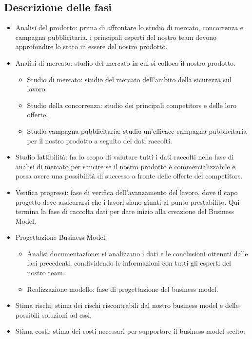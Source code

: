 \subsection{Descrizione delle fasi}
\begin{itemize}

\item Analisi del prodotto: prima di affrontare lo studio di mercato, concorrenza e campagna pubblicitaria, i principali esperti del nostro team devono approfondire lo stato in essere del nostro prodotto.

\item Analisi di mercato: studio del mercato in cui si colloca il nostro prodotto.
\begin{itemize}

\item Studio di mercato: studio del mercato dell'ambito della sicurezza sul lavoro.

\item Studio della concorrenza: studio dei principali competitors e delle loro offerte.

\item Studio campagna pubblicitaria: studio un'efficace campagna pubblicitaria per il nostro prodotto a seguito dei dati raccolti.

\end{itemize}

\item Studio fattibilità: ha lo scopo di valutare tutti i dati raccolti nella fase di analisi di mercato per sancire se il nostro prodotto è commercializzabile e possa avere una possibilità di successo a fronte delle offerte dei competitors.

\item Verifica progressi: fase di verifica dell'avanzamento del lavoro, dove il capo progetto deve assicurarsi che i lavori siano giunti al punto prestabilito. Qui termina la fase di raccolta dati per dare inizio alla creazione del Business Model. 

\item Progettazione Business Model:

\begin{itemize}

\item Analisi documentazione: si analizzano i dati e le conclusioni ottenuti dalle fasi precedenti, condividendo le informazioni con tutti gli esperti del nostro team.

\item Realizzazione modello: fase di progettazione del business model.

\end{itemize}

\item Stima rischi: stima dei rischi riscontrabili dal nostro business model e delle possibili soluzioni ad essi.

\item Stima costi: stima dei costi necessari per supportare il business model scelto.

\end{itemize}


